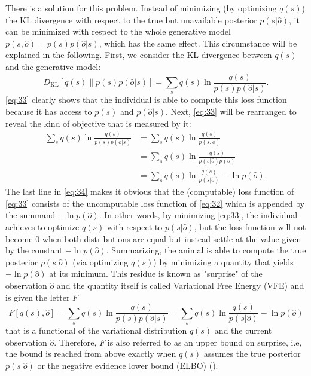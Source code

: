 There is a solution for this problem. Instead of minimizing (by optimizing \(q(s)\)) the KL divergence with respect to the true but unavailable posterior \(p(s|\hat o)\), it can be minimized with respect to the whole generative model \(p(s,\hat o)=p(s)p(\hat o|s)\), which has the same effect. This circumstance will be explained in the following. First, we consider the KL divergence between \(q(s)\) and the generative model:
\begin{equation}
    D_{\text{KL}}[q(s) \parallel p(s)p(\hat o|s)] = \sum_s q(s) \ln \frac{q(s)}{p(s)p(\hat o|s)}.
    \label{eq:33}
\end{equation}
\cref{eq:33} clearly shows that the individual is able to compute this loss function because it has access to \(p(s)\) and \(p(\hat o|s)\). Next, \cref{eq:33} will be rearranged to reveal the kind of objective that is measured by it:
\begin{equation}
    \begin{split}
        \sum_s q(s) \ln \frac{q(s)}{p(s)p(\hat o|s)} & = \sum_s q(s) \ln \frac{q(s)}{p(s,\hat o)}            \\
                                                      & = \sum_s q(s) \ln \frac{q(s)}{p(s|\hat o)p(o)}        \\
                                                      & = \sum_s q(s) \ln \frac{q(s)}{p(s|\hat o)} - \ln p(\hat o).
        \label{eq:34}
    \end{split}
\end{equation}
The last line in \cref{eq:34} makes it obvious that the (computable) loss function of \cref{eq:33} consists of the uncomputable loss function of \cref{eq:32} which is appended by the summand \(- \ln p(\hat o)\). In other words, by minimizing \cref{eq:33}, the individual achieves to optimize \(q(s)\) with respect to \(p(s|\hat o)\), but the loss function will not become 0 when both distributions are equal but instead settle at the value given by the constant \(- \ln p(\hat o)\). Summarizing, the animal is able to compute the true posterior \(p(s|\hat o)\) (via optimizing \(q(s)\)) by minimizing a quantity that yields \(- \ln p(\hat o)\) at its minimum. This residue is known as "surprise" of the observation \(\hat o\) and the quantity itself is called Variational Free Energy (VFE) and is given the letter \(F\)
\begin{equation}
    F[q(s), \hat o] = \sum_s q(s) \ln \frac{q(s)}{p(s)p(\hat o|s)} = \sum_s q(s) \ln \frac{q(s)}{p(s|\hat o)} - \ln p(\hat o)
\end{equation}
that is a functional of the variational distribution \(q(s)\) and the current observation \(\hat o\). Therefore, \(F\) is also referred to as an upper bound on surprise, i.e, the bound is reached from above exactly when \(q(s)\) assumes the true posterior \(p(s|\hat o)\) or the negative evidence lower bound (ELBO) (\cite{bishop2006}).


